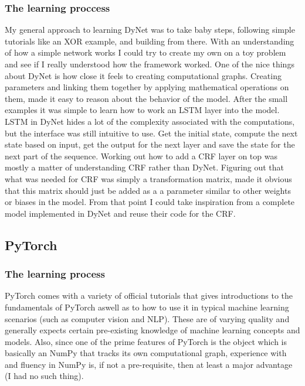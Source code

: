 \subsubsection*{The learning proccess}

My general approach to learning DyNet was to take baby steps, following simple
tutorials like an XOR example, and building from there. With an understanding of
how a simple network works I could try to create my own on a toy problem and see
if I really understood how the framework worked. One of the nice things about
DyNet is how close it feels to creating computational graphs. Creating
parameters and linking them together by applying mathematical operations on
them, made it easy to reason about the behavior of the model. After the small
examples it was simple to learn how to work an LSTM layer into the model. LSTM
in DyNet hides a lot of the complexity associated with the computations, but the
interface was still intuitive to use. Get the initial state, compute the next
state based on input, get the output for the next layer and save the state for
the next part of the sequence. Working out how to add a CRF layer on top was
mostly a matter of understanding CRF rather than DyNet. Figuring out that what
was needed for CRF was simply a transformation matrix, made it obvious that this
matrix should just be added as a a parameter similar to other weights or biases
in the model. From that point I could take inspiration from a complete model
implemented in DyNet and reuse their code for the CRF.\

\subsection{PyTorch}

\subsubsection*{The learning process}

PyTorch comes with a variety of official tutorials that gives introductions to
the fundamentals of PyTorch aswell as to how to use it in typical machine
learning scenarios (such as computer vision and NLP). These are of varying
quality and generally expects certain pre-existing knowledge of machine learning
concepts and models. Also, since one of the prime features of PyTorch is the
 object which is basically an NumPy  that tracks its
own computational graph, experience with and fluency in NumPy is, if not a
pre-requisite, then at least a major advantage (I had no such thing).

